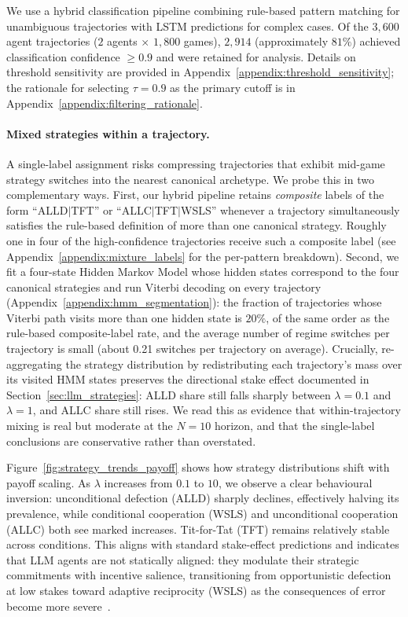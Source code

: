 \documentclass[a4paper,fleqn]{cas-sc}
\begin{document}
We use a hybrid classification pipeline combining rule-based pattern matching for unambiguous trajectories with LSTM predictions for complex cases. Of the $3{,}600$ agent trajectories ($2$ agents $\times$ $1{,}800$ games), $2{,}914$ (approximately $81\%$) achieved classification confidence $\geq 0.9$ and were retained for analysis. Details on threshold sensitivity are provided in Appendix~\ref{appendix:threshold_sensitivity}; the rationale for selecting $\tau = 0.9$ as the primary cutoff is in Appendix~\ref{appendix:filtering_rationale}.

\paragraph{Mixed strategies within a trajectory.} A single-label assignment risks compressing trajectories that exhibit mid-game strategy switches into the nearest canonical archetype. We probe this in two complementary ways. First, our hybrid pipeline retains \emph{composite} labels of the form ``ALLD$|$TFT'' or ``ALLC$|$TFT$|$WSLS'' whenever a trajectory simultaneously satisfies the rule-based definition of more than one canonical strategy. Roughly one in four of the high-confidence trajectories receive such a composite label (see Appendix~\ref{appendix:mixture_labels} for the per-pattern breakdown). Second, we fit a four-state Hidden Markov Model whose hidden states correspond to the four canonical strategies and run Viterbi decoding on every trajectory (Appendix~\ref{appendix:hmm_segmentation}): the fraction of trajectories whose Viterbi path visits more than one hidden state is $20\%$, of the same order as the rule-based composite-label rate, and the average number of regime switches per trajectory is small (about 0.21 switches per trajectory on average). Crucially, re-aggregating the strategy distribution by redistributing each trajectory's mass over its visited HMM states preserves the directional stake effect documented in Section~\ref{sec:llm_strategies}: ALLD share still falls sharply between $\lambda{=}0.1$ and $\lambda{=}1$, and ALLC share still rises. We read this as evidence that within-trajectory mixing is real but moderate at the $N{=}10$ horizon, and that the single-label conclusions are conservative rather than overstated.

Figure~\ref{fig:strategy_trends_payoff} shows how strategy distributions shift with payoff scaling. As $\lambda$ increases from $0.1$ to $10$, we observe a clear behavioural inversion: unconditional defection (ALLD) sharply declines, effectively halving its prevalence, while conditional cooperation (WSLS) and unconditional cooperation (ALLC) both see marked increases. Tit-for-Tat (TFT) remains relatively stable across conditions. This aligns with standard stake-effect predictions and indicates that LLM agents are not statically aligned: they modulate their strategic commitments with incentive salience, transitioning from opportunistic defection at low stakes toward adaptive reciprocity (WSLS) as the consequences of error become more severe~\cite{han_when_2021,sigmund:2010bo}.
\end{document}
